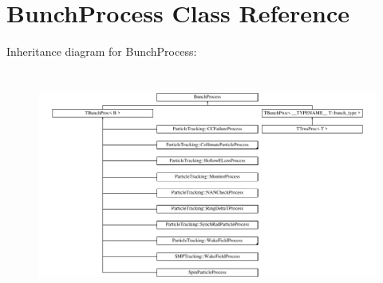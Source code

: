 \hypertarget{classBunchProcess}{}\section{Bunch\+Process Class Reference}
\label{classBunchProcess}
Inheritance diagram for Bunch\+Process\+:\begin{figure}[H]
\begin{center}
\leavevmode
\includegraphics[height=7.593220cm]{classBunchProcess}
\end{center}
\end{figure}
